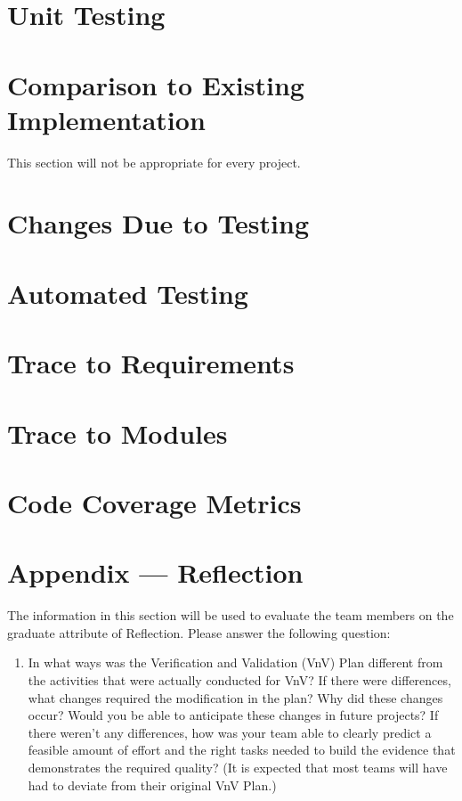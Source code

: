 \documentclass[12pt, titlepage]{article}
\begin{document}
\section{Unit Testing}
	
\section{Comparison to Existing Implementation}	

This section will not be appropriate for every project.

\section{Changes Due to Testing}


\section{Automated Testing}
		
\section{Trace to Requirements}
		
\section{Trace to Modules}		

\section{Code Coverage Metrics}




\newpage{}
\section*{Appendix --- Reflection}

The information in this section will be used to evaluate the team members on the
graduate attribute of Reflection.  Please answer the following question:

\begin{enumerate}
  \item In what ways was the Verification and Validation (VnV) Plan different
  from the activities that were actually conducted for VnV?  If there were
  differences, what changes required the modification in the plan?  Why did
  these changes occur?  Would you be able to anticipate these changes in future
  projects?  If there weren't any differences, how was your team able to clearly
  predict a feasible amount of effort and the right tasks needed to build the
  evidence that demonstrates the required quality?  (It is expected that most
  teams will have had to deviate from their original VnV Plan.)
\end{enumerate}
\end{document}
